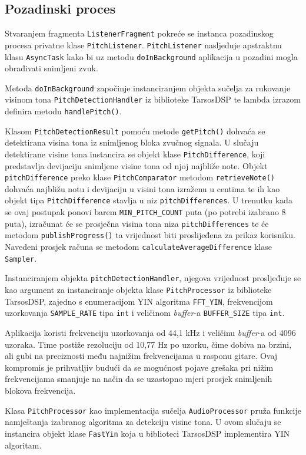 \documentclass[times, utf8, zavrsni, numeric]{fer}
\begin{document}
\subsection{Pozadinski proces}
Stvaranjem fragmenta \verb|ListenerFragment| pokreće se instanca pozadinskog procesa privatne klase \verb|PitchListener|. \verb|PitchListener| nasljeđuje apstraktnu klasu \verb|AsyncTask| kako bi uz metodu \verb|doInBackground| aplikacija u pozadini mogla obrađivati snimljeni zvuk.

Metoda \verb|doInBackground| započinje instanciranjem objekta sučelja za rukovanje visinom tona \verb|PitchDetectionHandler| iz biblioteke TarsosDSP te lambda izrazom definira metodu \verb|handlePitch()|. 

Klasom \verb|PitchDetectionResult| pomoću metode \verb|getPitch()| dohvaća se detektirana visina tona iz snimljenog bloka zvučnog signala. U slučaju detektirane visine tona instancira se objekt klase \verb|PitchDifference|, koji predstavlja devijaciju snimljene visine tona od njoj najbliže note. Objekt \verb|pitchDifference| preko klase \verb|PitchComparator|\cite{gstraube} metodom \verb|retrieveNote()| dohvaća najbližu notu i devijaciju u visini tona izraženu u centima te ih kao objekt tipa \verb|PitchDifference|\cite{gstraube} stavlja u niz \verb|pitchDifferences|. U trenutku kada se ovaj postupak ponovi barem \verb|MIN_PITCH_COUNT| puta (po potrebi izabrano 8 puta), izračunat će se prosječna visina tona niza \verb|pitchDifferences| te će metodom \verb|publishProgress()| ta vrijednost biti proslijeđena za prikaz korisniku. Navedeni prosjek računa se metodom \verb|calculateAverageDifference| klase \verb|Sampler|.

Instanciranjem objekta \verb|pitchDetectionHandler|, njegova vrijednost prosljeđuje se kao argument za instanciranje objekta klase \verb|PitchProcessor| iz biblioteke TarsosDSP, zajedno s enumeracijom YIN algoritma \verb|FFT_YIN|, frekvencijom uzorkovanja \verb|SAMPLE_RATE| tipa \verb|int| i veličinom \textit{buffer}-a \verb|BUFFER_SIZE| tipa \verb|int|. 

Aplikacija koristi frekvenciju uzorkovanja od 44,1 kHz i veličinu \textit{buffer}-a od 4096 uzoraka. Time postiže rezoluciju od 10,77 Hz po uzorku, čime dobiva na brzini, ali gubi na preciznosti među najnižim frekvencijama u rasponu gitare. Ovaj kompromis je prihvatljiv budući da se mogućnost pojave grešaka pri nižim frekvencijama smanjuje na način da se uzastopno mjeri prosjek snimljenih blokova frekvencija. 

Klasa \verb|PitchProcessor| kao implementacija sučelja \verb|AudioProcessor| pruža funkcije namještanja izabranog algoritma za detekciju visine tona. U ovom slučaju se instancira objekt klase \verb|FastYin| koja u biblioteci TarsosDSP implementira YIN algoritam.
\end{document}
